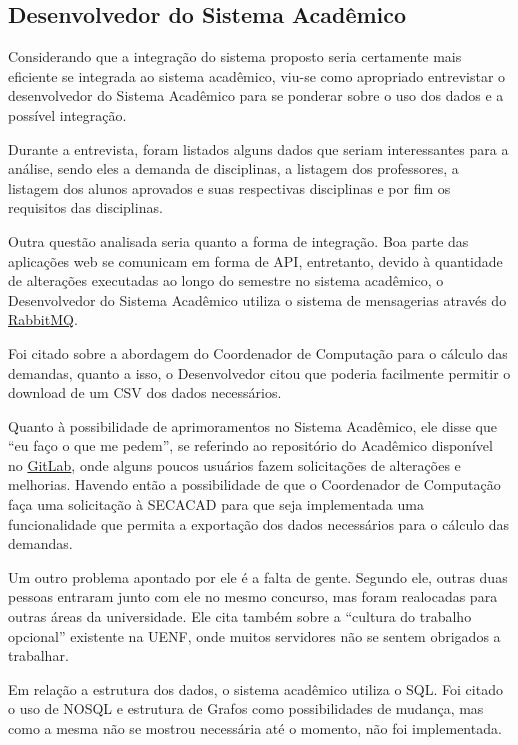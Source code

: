 \subsection{Desenvolvedor do Sistema Acadêmico} %

Considerando que a integração do sistema proposto seria certamente mais eficiente se integrada ao sistema acadêmico, viu-se como apropriado entrevistar o desenvolvedor do Sistema Acadêmico para se ponderar sobre o uso dos dados e a possível integração.

Durante a entrevista, foram listados alguns dados que seriam interessantes para a análise, sendo eles a demanda de disciplinas, a listagem dos professores, a listagem dos alunos aprovados e suas respectivas disciplinas e por fim os requisitos das disciplinas.


Outra questão analisada seria quanto a forma de integração. Boa parte das aplicações web se comunicam em forma de API, entretanto, devido à quantidade de alterações executadas ao longo do semestre no sistema acadêmico, o Desenvolvedor do Sistema Acadêmico utiliza o sistema de mensagerias através do \href{https://www.rabbitmq.com/}{RabbitMQ}.

Foi citado sobre a abordagem do Coordenador de Computação para o cálculo das demandas, quanto a isso, o Desenvolvedor citou que poderia facilmente permitir o download de um CSV dos dados necessários.

Quanto à possibilidade de aprimoramentos no Sistema Acadêmico, ele disse que ``eu faço o que me pedem'', se referindo ao repositório do Acadêmico disponível no \href{https://about.gitlab.com/}{GitLab}, onde alguns poucos usuários fazem solicitações de alterações e melhorias. Havendo então a possibilidade de que o Coordenador de Computação faça uma solicitação à SECACAD para que seja implementada uma funcionalidade que permita a exportação dos dados necessários para o cálculo das demandas.

Um outro problema apontado por ele é a falta de gente. Segundo ele, outras duas pessoas entraram junto com ele no mesmo concurso, mas foram realocadas para outras áreas da universidade. Ele cita também sobre a ``cultura do trabalho opcional'' existente na UENF, onde muitos servidores não se sentem obrigados a trabalhar.

Em relação a estrutura dos dados, o sistema acadêmico utiliza o SQL. Foi citado o uso de NOSQL e estrutura de Grafos como possibilidades de mudança, mas como a mesma não se mostrou necessária até o momento, não foi implementada.

